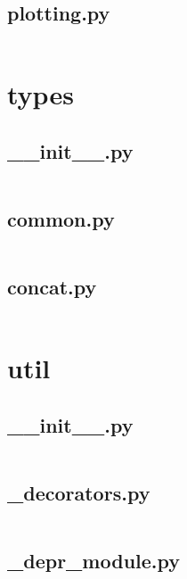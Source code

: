 \documentclass{article}
\begin{document}
\subsection{plotting.py}
\inputminted{python}{/home/dufferzafar/dev/@clones/pandas/pandas/tseries/plotting.py}
\newpage

\section{types}

\subsection{\_\_init\_\_.py}
\inputminted{python}{/home/dufferzafar/dev/@clones/pandas/pandas/types/__init__.py}
\newpage

\subsection{common.py}
\inputminted{python}{/home/dufferzafar/dev/@clones/pandas/pandas/types/common.py}
\newpage

\subsection{concat.py}
\inputminted{python}{/home/dufferzafar/dev/@clones/pandas/pandas/types/concat.py}
\newpage

\section{util}

\subsection{\_\_init\_\_.py}
\inputminted{python}{/home/dufferzafar/dev/@clones/pandas/pandas/util/__init__.py}
\newpage

\subsection{\_decorators.py}
\inputminted{python}{/home/dufferzafar/dev/@clones/pandas/pandas/util/_decorators.py}
\newpage

\subsection{\_depr\_module.py}
\inputminted{python}{/home/dufferzafar/dev/@clones/pandas/pandas/util/_depr_module.py}
\newpage
\end{document}
